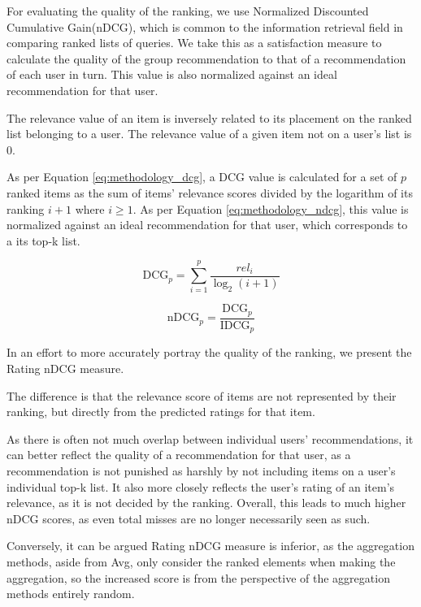 \label{sec:methodology_ndcg}
For evaluating the quality of the ranking, we use Normalized Discounted Cumulative Gain(nDCG), which is common to the information retrieval field in comparing ranked lists of queries. We take this as a satisfaction measure to calculate the quality of the group recommendation to that of a recommendation of each user in turn. This value is also normalized against an ideal recommendation for that user.


The relevance value of an item is inversely related to its placement on the ranked list belonging to a user. The relevance value of a given item not on a user's list is 0.

As per Equation \ref{eq:methodology_dcg}, a DCG value is calculated for a set of $p$ ranked items as the sum of items' relevance scores divided by the logarithm of its ranking $i + 1$ where $i \geq 1$. As per Equation \ref{eq:methodology_ndcg}, this value is normalized against an ideal recommendation for that user, which corresponds to a its top-k list.

\begin{equation}\label{eq:methodology_dcg}
\text{DCG}_p = \sum_{i=1}^{p}\frac{\textit{rel}_i}{\log_2(i + 1)}
\end{equation}

\begin{equation}\label{eq:methodology_ndcg}
\text{nDCG}_p = \frac{\text{DCG}_p}{\text{IDCG}_p}
\end{equation}

In an effort to more accurately portray the quality of the ranking, we present the Rating nDCG measure.

The difference is that the relevance score of items are not represented by their ranking, but directly from the predicted ratings for that item.

As there is often not much overlap between individual users' recommendations, it can better reflect the quality of a recommendation for that user, as a recommendation is not punished as harshly by not including items on a user's individual top-k list. It also more closely reflects the user's rating of an item's relevance, as it is not decided by the ranking. Overall, this leads to much higher nDCG scores, as even total misses are no longer necessarily seen as such.

Conversely, it can be argued Rating nDCG measure is inferior, as the aggregation methods, aside from Avg, only consider the ranked elements when making the aggregation, so the increased score is from the perspective of the aggregation methods entirely random.